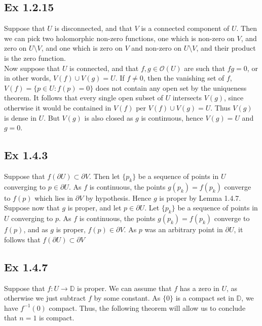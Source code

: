 \documentclass{article}
\theoremstyle{definition}
\newcommand{\D}{\mathbb{D}}
\begin{document}
\subsection*{Ex 1.2.15}

Suppose that $U$ is disconnected, and that $V$ is a connected component of $U$.
Then we can pick two holomorphic non-zero functions, one which is non-zero on
$V$, and zero on $U \setminus V$, and one which is zero on $V$ and non-zero on
$U \setminus V$, and their product is the zero function. \\

Now suppose that $U$ is connected, and that $f,g \in \mathcal{O}(U)$ are such
that $fg = 0$, or in other words, $V(f) \cup V(g) = U$. If $f \not = 0$, then
the vanishing set of $f$, $V(f) = \{p \in U : f(p) = 0\}$ does not contain any
open set by the uniqueness theorem. It follows that every single open subset of
$U$ intersects $V(g)$, since otherwise it would be contained in $V(f)$ per
$V(f) \cup V(g) = U$. Thus $V(g)$ is dense in $U$. But $V(g)$ is also closed as
$g$ is continuous, hence $V(g) = U$ and $g = 0$.

\subsection*{Ex 1.4.3}

Suppose that $f(\partial U) \subset \partial V$. Then let $\{p_k\}$ be a
sequence of points in $U$ converging to $p \in \partial U$. As $f$ is
continuous, the points $g(p_k) = f(p_k)$ converge to $f(p)$ which lies in
$\partial V$ by hypothesis. Hence $g$ is proper by Lemma 1.4.7. \\

Suppose now that $g$ is proper, and let $p \in \partial U$. Let $\{p_k\}$ be a
sequence of points in $U$ converging to $p$. As $f$ is continuous, the points
$g(p_k) = f(p_k)$ converge to $f(p)$, and as $g$ is proper, $f(p) \in \partial
V$. As $p$ was an arbitrary point in $\partial U$, it follows that $f(\partial
U) \subset \partial V$

\subsection*{Ex 1.4.7}

Suppose that $f : U \to \D$ is proper. We can assume that $f$ has a zero in
$U$, as otherwise we just subtract $f$ by some constant. As $\{0\}$ is a
compact set in $\D$, we have $f^{-1}(0)$ compact. Thus, the following theorem
will allow us to conclude that $n = 1$ is compact.
\end{document}
